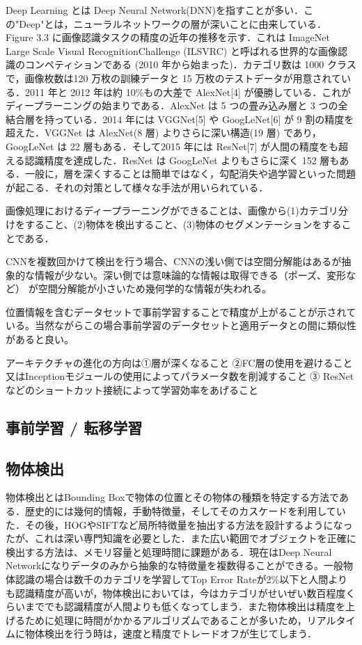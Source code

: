 Deep Learning とは Deep Neural Network(DNN)を指すことが多い．この"Deep"とは，ニューラルネットワークの層が深いことに由来している．
Figure 3.3 に画像認識タスクの精度の近年の推移を示す．これは ImageNet Large Scale Visual RecognitionChallenge (ILSVRC) と呼ばれる世界的な画像認識のコンペティションである (2010 年から始まった)．カテゴリ数は 1000 クラスで，画像枚数は120 万枚の訓練データと 15 万枚のテストデータが用意されている．2011 年と 2012 年は約 10\%もの大差で AlexNet[4] が優勝している．これがディープラーニングの始まりである．AlexNet は 5 つの畳み込み層と 3 つの全結合層を持っている．2014 年には VGGNet[5] や GoogLeNet[6] が 9 割の精度を超えた．VGGNet は AlexNet(8 層) よりさらに深い構造(19 層) であり，GoogLeNet は 22 層もある．そして2015 年には ResNet[7] が人間の精度をも超える認識精度を達成した．ResNet は GoogLeNet よりもさらに深く 152 層もある．一般に，層を深くすることは簡単ではなく，勾配消失や過学習といった問題が起こる．それの対策として様々な手法が用いられている．

画像処理におけるディープラーニングができることは、画像から(1)カテゴリ分けをすること、(2)物体を検出すること、(3)物体のセグメンテーションをすることである．

CNNを複数回かけて検出を行う場合、CNNの浅い側では空間分解能はあるが抽象的な情報が少ない。深い側では意味論的な情報は取得できる（ポーズ、変形など） が空間分解能が小さいため幾何学的な情報が失われる。

位置情報を含むデータセットで事前学習することで精度が上がることが示されている。当然ながらこの場合事前学習のデータセットと適用データとの間に類似性があると良い。

アーキテクチャの進化の方向は①層が深くなること ②FC層の使用を避けること又はInceptionモジュールの使用によってパラメータ数を削減すること ③ ResNetなどのショートカット接続によって学習効率をあげること

\subsection*{事前学習 / 転移学習}

\subsection*{物体検出}
物体検出とはBounding Boxで物体の位置とその物体の種類を特定する方法である．歴史的には幾何的情報，手動特徴量，そしてそのカスケードを利用していた．その後，HOGやSIFTなど局所特徴量を抽出する方法を設計するようになったが、これは深い専門知識を必要とした．また広い範囲でオブジェクトを正確に検出する方法は、メモリ容量と処理時間に課題がある．現在はDeep Neural Networkになりデータのみから抽象的な特徴量を複数得ることができる。一般物体認識の場合は数千のカテゴリを学習してTop Error Rateが2\%以下と人間よりも認識精度が高いが，物体検出においては，今はカテゴリがせいぜい数百程度くらいまででも認識精度が人間よりも低くなってしまう．また物体検出は精度を上げるために処理に時間がかかるアルゴリズムであることが多いため，リアルタイムに物体検出を行う時は，速度と精度でトレードオフが生じてしまう．

